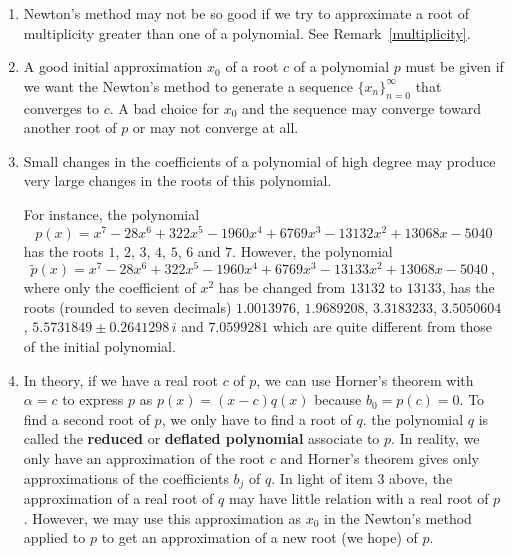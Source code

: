 \begin{rmkList}
\begin{enumerate}
\item Newton's method may not be so good if we try to
approximate a root of multiplicity greater than one of a polynomial.
See Remark~\ref{multiplicity}.
\item A good initial approximation $x_0$ of a root $c$ of a polynomial
$p$ must be given if we want the Newton's method to generate a
sequence $\{x_n\}_{n=0}^\infty$ that converges to $c$.  A bad choice for
$x_0$ and the sequence may converge toward another root of $p$ or may
not converge at all.
\item Small changes in the coefficients of a polynomial of high degree
may produce very large changes in the roots of this polynomial.

For instance, the polynomial
\[
p(x) = x^7 - 28x^6 +322x^5 - 1960x^4 + 6769x^3
- 13132x^2 +13068x - 5040
\]
has the roots $1$, $2$, $3$, $4$, $5$, $6$ and $7$.  However, the
polynomial
\[
\tilde{p}(x) = x^7 - 28x^6 +322x^5 -1960x^4 + 6769x^3
-13133x^2 +13068x -5040 \ ,
\]
where only the coefficient of $x^2$ has be changed from $13132$ to
$13133$, has the roots (rounded to seven decimals) $1.0013976$,
$1.9689208$, $3.3183233$, $3.5050604$, $5.5731849 \pm 0.2641298\, i$
and $7.0599281$ which are quite different from those of the initial
polynomial.
\item In theory, if we have a real root $c$ of $p$, we can use Horner's
theorem with $\alpha = c$ to express $p$ as $p(x) = (x-c)q(x)$
because $b_0 = p(c) = 0$.  To find a second root of $p$, we only have to
find a root of $q$.  the polynomial $q$ is called the
{\bfseries reduced} or
{\bfseries deflated polynomial} associate to
$p$.  In reality, we only have an approximation of the root $c$ and
Horner's theorem gives only approximations of the coefficients $b_j$
of $q$.  In light of item 3 above, the approximation of a real root of
$q$ may have little relation with a real root of $p$.  However, we may
use this approximation as $x_0$ in the Newton's method applied to
$p$ to get an approximation of a new root (we hope) of $p$.
\end{enumerate}
\end{rmkList}

